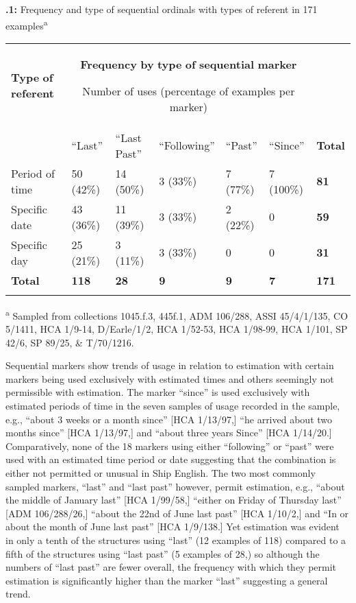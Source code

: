 \textbf{.1:} Frequency and type of sequential ordinals with types of referent in 171 examples\textsuperscript{a}

\tablefirsthead{}

\tabletail{}
\tablelasttail{}
\begin{tabularx}{\textwidth}{XXXXXXX}

\lsptoprule
\textbf{Type} \textbf{of} \textbf{referent} & \multicolumn{5}{c}{\textbf{Frequency} \textbf{by} \textbf{type} \textbf{of} \textbf{sequential} \textbf{marker}

Number of uses (percentage of examples per marker)} & \\
& “Last” & “Last Past” & “Following” & “Past” & “Since” & \textbf{Total}\\
Period of time & 50 (42\%) & 14 (50\%) & 3 (33\%) & 7 (77\%) & 7 (100\%) & \textbf{81}\\
Specific date & 43 (36\%) & 11 (39\%) & 3 (33\%) & 2 (22\%) & 0 & \textbf{59}\\
Specific day & 25 (21\%) & 3 (11\%) & 3 (33\%) & 0 & 0 & \textbf{31}\\
\raggedleft \textbf{Total} & \textbf{118}    &  \textbf{28} &     \textbf{9} &  \textbf{9} &  \textbf{7} & \textbf{171}\\
\lspbottomrule
\end{tabularx}
\textsuperscript{a} Sampled from collections 1045.f.3, 445f.1, ADM 106/288, ASSI 45/4/1/135, CO 5/1411, HCA 1/9-14, D/Earle/1/2, HCA 1/52-53, HCA 1/98-99, HCA 1/101, SP 42/6, SP 89/25, \& T/70/1216.

  Sequential markers show trends of usage in relation to estimation with certain markers being used exclusively with estimated times and others seemingly not permissible with estimation. The marker “since” is used exclusively with estimated periods of time in the seven samples of usage recorded in the sample, e.g., “about 3 weeks or a month since” [HCA 1/13/97,] “he arrived about two months since” [HCA 1/13/97,] and “about three years Since” [HCA 1/14/20.] Comparatively, none of the 18 markers using either “following” or “past” were used with an estimated time period or date suggesting that the combination is either not permitted or unusual in Ship English. The two most commonly sampled markers, “last” and “last past” however, permit estimation, e.g., “about the middle of January last” [HCA 1/99/58,] “either on Friday of Thursday last” [ADM 106/288/26,] “about the 22nd of June last past” [HCA 1/10/2,] and “In or about the month of June last past” [HCA 1/9/138.] Yet estimation was evident in only a tenth of the structures using “last” (12 examples of 118) compared to a fifth of the structures using “last past” (5 examples of 28,) so although the numbers of “last past” are fewer overall, the frequency with which they permit estimation is significantly higher than the marker “last” suggesting a general trend. 

